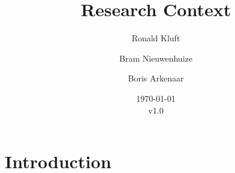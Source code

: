 \documentclass{article}
\begin{document}
 

\title{Research Context}
\author{Ronald Kluft \and Bram Nieuwenhuize \and Boris Arkenaar}
\date{\today\\v1.0}
\maketitle 

\section{Introduction}




\end{document}
